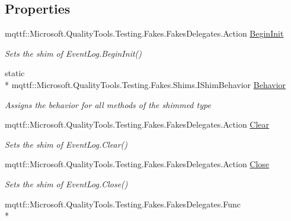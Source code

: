 \subsection*{Properties}
\begin{DoxyCompactItemize}
\item 
mqttf\-::\-Microsoft.\-Quality\-Tools.\-Testing.\-Fakes.\-Fakes\-Delegates.\-Action \hyperlink{class_system_1_1_diagnostics_1_1_fakes_1_1_shim_event_log_aa701c8bad9e12a450cb8fe1ff60774c4}{Begin\-Init}
\begin{DoxyCompactList}\small\item\em Sets the shim of Event\-Log.\-Begin\-Init()\end{DoxyCompactList}\item 
static \\*
mqttf\-::\-Microsoft.\-Quality\-Tools.\-Testing.\-Fakes.\-Shims.\-I\-Shim\-Behavior \hyperlink{class_system_1_1_diagnostics_1_1_fakes_1_1_shim_event_log_a963213ef14a064dd0ee0df890cf8f55f}{Behavior}
\begin{DoxyCompactList}\small\item\em Assigns the behavior for all methods of the shimmed type\end{DoxyCompactList}\item 
mqttf\-::\-Microsoft.\-Quality\-Tools.\-Testing.\-Fakes.\-Fakes\-Delegates.\-Action \hyperlink{class_system_1_1_diagnostics_1_1_fakes_1_1_shim_event_log_acd3e91cfc0e06cab11e2c92a78f0fddb}{Clear}
\begin{DoxyCompactList}\small\item\em Sets the shim of Event\-Log.\-Clear()\end{DoxyCompactList}\item 
mqttf\-::\-Microsoft.\-Quality\-Tools.\-Testing.\-Fakes.\-Fakes\-Delegates.\-Action \hyperlink{class_system_1_1_diagnostics_1_1_fakes_1_1_shim_event_log_acdfd3f6eac68a4abbd98de13939d62fe}{Close}
\begin{DoxyCompactList}\small\item\em Sets the shim of Event\-Log.\-Close()\end{DoxyCompactList}\item 
mqttf\-::\-Microsoft.\-Quality\-Tools.\-Testing.\-Fakes.\-Fakes\-Delegates.\-Func\\*

\end{DoxyCompactItemize}
